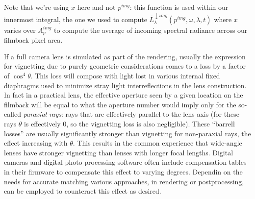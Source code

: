 


Note that we're using $x$ here and not $p^{img}$: this function is used within
our innermost integral, the one we used to compute  
$\bar L^{\downarrow img}_{\lambda}(p^{img}, \omega, \lambda, t)$
where $x$ varies over $A_p^{img}$ to compute the average of incoming
spectral \gls{radiance} across our filmback pixel area.


If a full camera lens is simulated as part of the rendering, usually the expression
for vignetting due to purely geometric considerations comes to a loss by a 
factor of $\cos^4\theta$. 
This loss will compose with light lost in various internal fixed 
diaphragms used to minimize stray light interreflections in the lens construction.
In fact in a practical lens, the effective aperture seen by a given 
location on the \gls{filmback} will be equal to what the aperture number would 
imply only for the so-called \textsl{paraxial rays}: rays that are effectively parallel to 
the lens axis (for these rays $\theta$ is effectively $0$, so the vignetting loss is also
negligible).
These ``barrell losses'' are usually significantly stronger than vignetting for non-paraxial
rays, the effect increasing with $\theta$.
This results in the common experience that wide-angle lenses have stronger vignetting
than lenses with longer focal lengths.
Digital cameras and digital photo processing software often include compensation 
tables in their firmware to compensate this effect to varying degrees.  
Dependin on the needs for accurate matching various approaches, in rendering or
postprocessing, can be employed to counteract this effect as desired.


